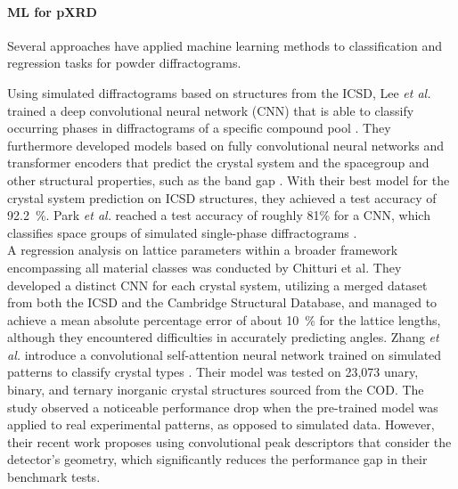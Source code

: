 
\paragraph{ML for pXRD} Several approaches have applied machine learning methods to classification and regression tasks for powder diffractograms.

Using simulated diffractograms based on structures from the ICSD, Lee {\it et al.} trained a deep convolutional neural network (CNN) that is able to classify occurring phases in diffractograms of a specific compound pool \cite{Lee2020}. They furthermore developed models based on fully convolutional neural networks and transformer encoders that predict the crystal system and the spacegroup and other structural properties, such as the band gap \cite{Lee2022}. With their best model for the crystal system prediction on ICSD structures, they achieved a test accuracy of \SI{92.2}{\percent}. Park {\it et al.} reached a test accuracy of roughly 81\% for a CNN, which classifies space groups of simulated single-phase diffractograms \cite{Park2017}. \\

A regression analysis on lattice parameters within a broader framework encompassing all material classes was conducted by Chitturi et al\cite{Chitturi2021}. They developed a distinct CNN for each crystal system, utilizing a merged dataset from both the ICSD and the Cambridge Structural Database, and managed to achieve a mean absolute percentage error of about \SI{10}{\percent} for the lattice lengths, although they encountered difficulties in accurately predicting angles.
Zhang {\it et al.} introduce a convolutional self-attention neural network trained on simulated patterns to classify crystal types \cite{zhang2024crystallographic}. Their model was tested on 23,073 unary, binary, and ternary inorganic crystal structures sourced from the COD. The study observed a noticeable performance drop when the pre-trained model was applied to real experimental patterns, as opposed to simulated data. However, their recent work \cite{cao2024simxrd} proposes using convolutional peak descriptors that consider the detector's geometry, which significantly reduces the performance gap in their benchmark tests.\\

